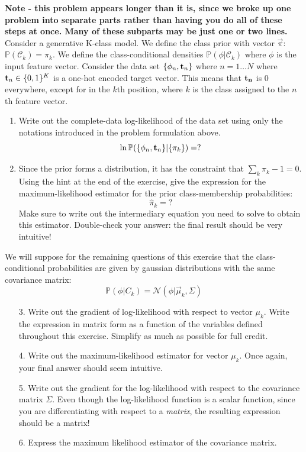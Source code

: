 \documentclass[submit]{harvardml}
\begin{document}
\begin{problem}
\textbf{Note - this problem appears longer than it is, since we broke up one problem into separate parts rather
than having you do all of these steps at once. Many of these subparts may be just one or two lines.}\\

Consider a generative K-class model.  We define the class prior with vector
$\vec \pi$: $\mathbb{P}(\mathcal{C}_k) = \pi_k$.  We define the
class-conditional densities $\mathbb{P}(\phi|\mathcal{C}_k)$ where $\phi$ is the
input feature vector. Consider the data set $\{\phi_n, {\bf t}_n\}$ where $n = 1 \dots N$ where ${\bf
t}_n \in \{0,1\}^K$ is a one-hot encoded target vector. This means that
$\bf{t}_n$ is 0 everywhere, except for in the $k$th position, where $k$ is the
class assigned to the $n$th feature vector.
\begin{enumerate}
  \item Write out the complete-data log-likelihood of the data set using only the
    notations introduced in the problem formulation above.
    $$\ln \mathbb{P}(\{\phi_n, {\bf t}_n \} | \{\pi_k \}) =?$$
  \item Since the prior forms a distribution, it has the constraint that
    $\sum_k\pi_k - 1 = 0$.  Using the hint at the end of the exercise, give the
    expression for the maximum-likelihood estimator for the prior
    class-membership probabilities:
    $$\hat \pi_k =?$$
    Make sure to write out the intermediary equation you need
    to solve to obtain this estimator. Double-check your answer: the final
    result should be very intuitive!
\end{enumerate}
    We will suppose for the remaining questions of this exercise that the
    class-conditional probabilities are given by gaussian distributions with the
    same covariance matrix:
    $$\mathbb{P}(\phi | C_k) = \mathcal{N}(\phi | \vec \mu_k, \Sigma)$$
    \begin{enumerate}
  \item[3.] Write out the gradient of log-likelihood with respect to vector $\mu_k$.
    Write the expression in matrix form as a function of the variables defined
    throughout this exercise. Simplify as much as possible for full credit.
  \item[4.] Write out the maximum-likelihood estimator for vector $\mu_k$. Once
    again, your final answer should seem intuitive.
  \item[5.] Write out the gradient for the log-likelihood with respect to the
    covariance matrix $\Sigma$. Even though the log-likelihood function is a
    scalar function, since you are differentiating with respect to a
    \emph{matrix}, the resulting expression should be a matrix!
  \item[6.] Express the maximum likelihood estimator of the covariance matrix.
\end{enumerate}


\end{problem}
\end{document}
